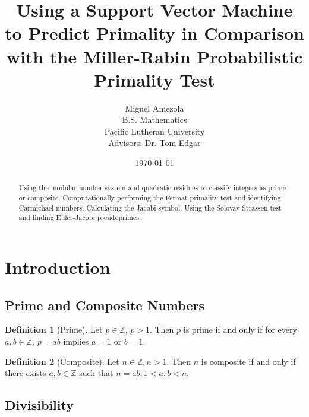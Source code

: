 \documentclass[12pt, titlepage]{amsart}
\title{Using a Support Vector Machine to Predict Primality in Comparison with the Miller-Rabin Probabilistic Primality Test}
\author{Miguel Amezola \\
	B.S. Mathematics \\
	Pacific Lutheran University  \\
	Advisors: Dr. Tom Edgar
}
\date{\today}
\newcommand\Z{{\mathbb Z}}
\theoremstyle{definition}
\newtheorem{definition}{Definition}[subsection]
\begin{document}
	
	\lstset{language=Python}          %
		
	
	\begin{abstract}
		Using the modular number system and quadratic residues to classify integers as prime or composite. Computationally performing the Fermat primality test and identifying Carmichael numbers. Calculating the Jacobi symbol. Using the Solovay-Strassen test and finding Euler-Jacobi pseudoprimes.
	\end{abstract}

	\maketitle
	
	\tableofcontents
	\newpage
	
	
	\section{Introduction}

		
	\subsection{Prime and Composite Numbers}
	
	\begin{definition}[Prime]\label{definition:prime}
		Let $p \in \Z$, $p > 1$. Then $p$ is prime if and only if for every $a, b \in \Z$, $p=ab$ implies $a=1$ or $b=1$. \cite{pommersheim}
	\end{definition}
	
	\begin{definition}[Composite]\label{definition:composite}
		Let $n \in \Z, n > 1$. Then $n$ is composite if and only if there exists $a, b \in \Z$ such that $n=ab, 1<a,b<n$. \cite{pommersheim}
	\end{definition}

	\subsection{Divisibility}
		
\end{document}
